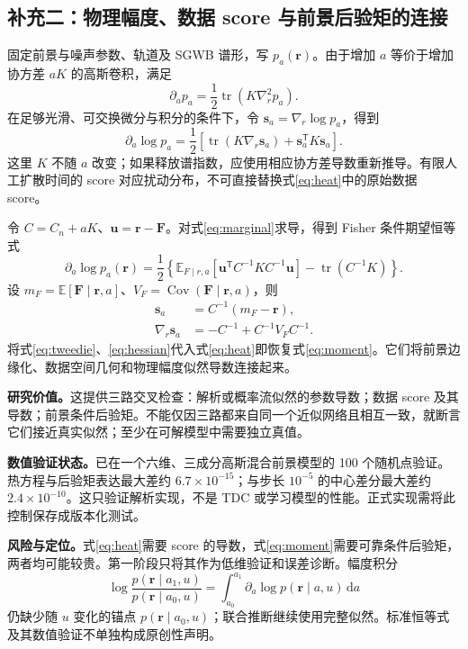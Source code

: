 \documentclass[UTF8,fontset=fandol,a4paper,11pt]{ctexart}
\numberwithin{equation}{section}
\newcommand{\E}{\mathbb E}
\newcommand{\Cov}{\operatorname{Cov}}
\newcommand{\tr}{\operatorname{tr}}
\newcommand{\dd}{\mathrm d}
\newcommand{\bs}{\boldsymbol s}
\newcommand{\br}{\boldsymbol r}
\newcommand{\bF}{\boldsymbol F}
\begin{document}
\subsection{补充二：物理幅度、数据 score 与前景后验矩的连接}
固定前景与噪声参数、轨道及 SGWB 谱形，写 $p_a(\br)$。由于增加 $a$ 等价于增加协方差 $aK$ 的高斯卷积，满足
\begin{equation}
\partial_a p_a=\frac12\tr(K\nabla_r^2p_a).
\end{equation}
在足够光滑、可交换微分与积分的条件下，令 $\bs_a=\nabla_r\log p_a$，得到
\begin{equation}
\partial_a\log p_a
=\frac12\left[\tr(K\nabla_r\bs_a)+\bs_a^{\mathsf T}K\bs_a\right].
\label{eq:heat}
\end{equation}
这里 $K$ 不随 $a$ 改变；如果释放谱指数，应使用相应协方差导数重新推导。有限人工扩散时间的 score 对应扰动分布，不可直接替换式\eqref{eq:heat}中的原始数据 score。

令 $C=C_n+aK$、$\boldsymbol u=\br-\bF$。对式\eqref{eq:marginal}求导，得到 Fisher 条件期望恒等式
\begin{equation}
\partial_a\log p_a(\br)=\frac12\left\{
\E_{F\mid r,a}\!\left[\boldsymbol u^{\mathsf T}C^{-1}KC^{-1}\boldsymbol u\right]
-\tr(C^{-1}K)\right\}.
\label{eq:moment}
\end{equation}
设 $m_F=\E[\bF\mid\br,a]$、$V_F=\Cov(\bF\mid\br,a)$，则
\begin{align}
\bs_a&=C^{-1}(m_F-\br),\label{eq:tweedie}\\
\nabla_r\bs_a&=-C^{-1}+C^{-1}V_FC^{-1}.
\label{eq:hessian}
\end{align}
将式\eqref{eq:tweedie}、\eqref{eq:hessian}代入式\eqref{eq:heat}即恢复式\eqref{eq:moment}。它们将前景边缘化、数据空间几何和物理幅度似然导数连接起来。

\textbf{研究价值。}这提供三路交叉检查：解析或概率流似然的参数导数；数据 score 及其导数；前景条件后验矩。不能仅因三路都来自同一个近似网络且相互一致，就断言它们接近真实似然；至少在可解模型中需要独立真值。

\textbf{数值验证状态。}已在一个六维、三成分高斯混合前景模型的 100 个随机点验证。热方程与后验矩表达最大差约 $6.7\times10^{-15}$；与步长 $10^{-5}$ 的中心差分最大差约 $2.4\times10^{-10}$。这只验证解析实现，不是 TDC 或学习模型的性能。正式实现需将此控制保存成版本化测试。

\textbf{风险与定位。}式\eqref{eq:heat}需要 score 的导数，式\eqref{eq:moment}需要可靠条件后验矩，两者均可能较贵。第一阶段只将其作为低维验证和误差诊断。幅度积分
\begin{equation}
\log\frac{p(\br\mid a_1,u)}{p(\br\mid a_0,u)}
=\int_{a_0}^{a_1}\partial_a\log p(\br\mid a,u)\,\dd a
\end{equation}
仍缺少随 $u$ 变化的锚点 $p(\br\mid a_0,u)$；联合推断继续使用完整似然。标准恒等式及其数值验证不单独构成原创性声明。
\end{document}
